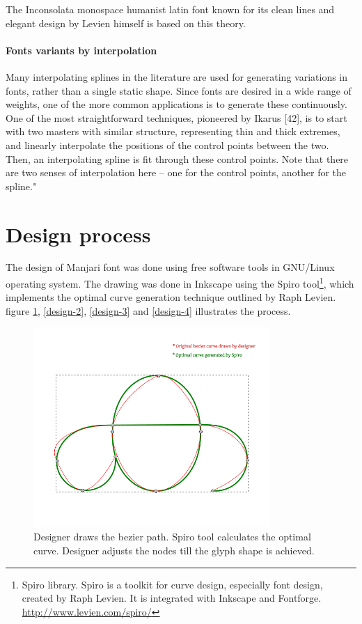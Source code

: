 \documentclass[10pt]{article}
\begin{document}
The Inconsolata monospace humanist latin font known for its clean lines and elegant design by Levien himself is based on this theory.

\paragraph{Fonts variants by interpolation}
Many interpolating splines in the literature are used for generating variations in fonts, rather
than a single static shape. Since fonts are desired in a wide range of weights, one of the more
common applications is to generate these continuously. One of the most straightforward techniques,
pioneered by Ikarus [42], is to start with two masters with similar structure, representing thin
and thick extremes, and linearly interpolate the positions of the control points between the two.
Then, an interpolating spline is fit through these control points. Note that there are two senses of
interpolation here – one for the control points, another for the spline." \cite{lamport94}

\section{Design process}

The design of Manjari font was done using free software tools in GNU/Linux operating system. The drawing was done in Inkscape using the Spiro tool\footnote{Spiro library. Spiro is a toolkit for curve design, especially font design, created by Raph Levien. It is integrated with Inkscape and Fontforge. \url{http://www.levien.com/spiro/}}, which implements the optimal curve generation technique outlined by Raph Levien. figure \ref{design-1}, \ref{design-2}, \ref{design-3} and \ref{design-4} illustrates the process.

\begin{figure}[h!]
	\centering
	\includegraphics[width=0.8\textwidth]{images/design-1-spiral.png}
	\caption{Designer draws the bezier path. Spiro tool calculates the optimal curve. Designer adjusts the nodes till the glyph shape is achieved.}
	\label{design-1}
\end{figure}
\end{document}
